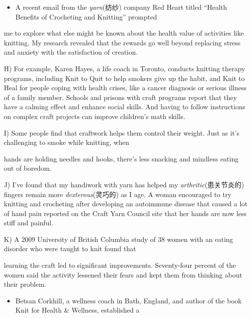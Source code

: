 \documentclass[UTF8,11pt]{ctexart}
\begin{document}
\begin{itemize}[leftmargin=2em,itemsep=.2em,topsep=.4em]\item[G.] A recent email from the\textit{ yarn}(纺纱) company Red Heart titled “Health Benefits of Crocheting and Knitting” prompted
\end{itemize}

me to explore what else might be known about the health value of activities like knitting. My research revealed that the rewards go well beyond replacing stress and anxiety with the satisfaction of creation.


H) For example, Karen Hayes, a life coach in Toronto, conducts knitting therapy programs, including Knit to Quit to help smokers give up the habit, and Knit to Heal for people coping with health crises, like a cancer diagnosis or serious illness of a family member. Schools and prisons with craft programs report that they have a calming effect and enhance social skills. And having to follow instructions on complex craft projects can improve children’s math skills.


I) Some people find that craftwork helps them control their weight. Just as it’s challenging to smoke while knitting, when


hands are holding needles and hooks, there’s less snacking and mindless eating out of boredom.


J) I’ve found that my handiwork with yarn has helped my\textit{ arthritic}(患关节炎的) fingers remain more\textit{ dexterous}(灵巧的) as I age. A woman encouraged to try knitting and crocheting after developing an autoimmune disease that caused a lot of hand pain reported on the Craft Yarn Council site that her hands are now less stiff and painful.


K) A 2009 University of British Columbia study of 38 women with an eating disorder who were taught to knit found that


learning the craft led to significant improvements. Seventy-four percent of the women said the activity lessened their fears and kept them from thinking about their problem.


\begin{itemize}[leftmargin=2em,itemsep=.2em,topsep=.4em]\item[L.] Betsan Corkhill, a wellness coach in Bath, England, and author of the book Knit for Health \& Wellness, established a
\end{itemize}
\end{document}

